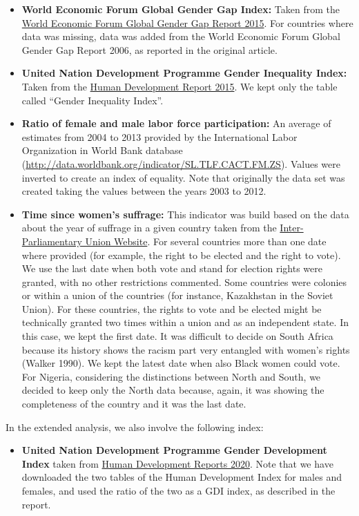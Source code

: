 \documentclass[
]{article}
\providecommand{\tightlist}{%
  \setlength{\itemsep}{0pt}\setlength{\parskip}{0pt}}
\begin{document}
\begin{itemize}
\item
  \textbf{World Economic Forum Global Gender Gap Index:} Taken from the
  \href{http://reports.weforum.org/}{World Economic Forum Global Gender
  Gap Report 2015}. For countries where data was missing, data was added
  from the World Economic Forum Global Gender Gap Report 2006, as
  reported in the original article.
\item
  \textbf{United Nation Development Programme Gender Inequality Index:}
  Taken from the
  \href{http://hdr.undp.org/sites/default/files/hdr_2016_statistical_annex.pdf}{Human
  Development Report 2015}. We kept only the table called ``Gender
  Inequality Index''.
\item
  \textbf{Ratio of female and male labor force participation:} An
  average of estimates from 2004 to 2013 provided by the International
  Labor Organization in World Bank database
  (\url{http://data.worldbank.org/indicator/SL.TLF.CACT.FM.ZS}). Values
  were inverted to create an index of equality. Note that originally the
  data set was created taking the values between the years 2003 to 2012.
\item
  \textbf{Time since women's suffrage:} This indicator was build based
  on the data about the year of suffrage in a given country taken from
  the
  \href{http://www.ipu.org/wmn-e/suffrage.htm\#Note1}{Inter-Parliamentary
  Union Website}. For several countries more than one date where
  provided (for example, the right to be elected and the right to vote).
  We use the last date when both vote and stand for election rights were
  granted, with no other restrictions commented. Some countries were
  colonies or within a union of the countries (for instance, Kazakhstan
  in the Soviet Union). For these countries, the rights to vote and be
  elected might be technically granted two times within a union and as
  an independent state. In this case, we kept the first date. It was
  difficult to decide on South Africa because its history shows the
  racism part very entangled with women's rights (Walker 1990). We kept
  the latest date when also Black women could vote. For Nigeria,
  considering the distinctions between North and South, we decided to
  keep only the North data because, again, it was showing the
  completeness of the country and it was the last date.
\end{itemize}

In the extended analysis, we also involve the following index:

\begin{itemize}
\tightlist
\item
  \textbf{United Nation Development Programme Gender Development Index}
  taken from
  \href{https://hdr.undp.org/en/content/gender-development-index-gdi}{Human
  Development Reports 2020}. Note that we have downloaded the two tables
  of the Human Development Index for males and females, and used the
  ratio of the two as a GDI index, as described in the report.
\end{itemize}
\end{document}
